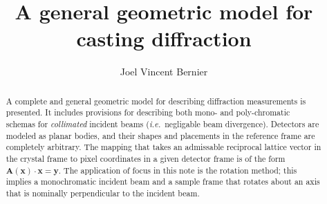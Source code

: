 \documentclass[11pt,letterpaper,final]{amsart}
\author{Joel Vincent Bernier}
\title{A general geometric model for casting diffraction}
\newcommand{\ie}{{\em i.e.}}
\begin{document}
\maketitle
\begin{abstract}
A complete and general geometric model for describing diffraction
measurements is presented.  It includes provisions for describing both
mono- and poly-chromatic schemas for {\em collimated} incident beams
(\ie\ negligable beam divergence).  Detectors are modeled as planar
bodies, and their shapes and placements in the reference frame are
completely arbitrary.  The mapping that takes an admissable reciprocal
lattice vector in the crystal frame to pixel coordinates in a given
detector frame is of the form $\mathbf{A}(\mathbf{x})\cdot\mathbf{x} =
\mathbf{y}$.  The application of focus in this note is the rotation
method; this implies a monochromatic incident beam and a sample frame
that rotates about an axis that is nominally perpendicular to the
incident beam.
\end{abstract}
\end{document}
